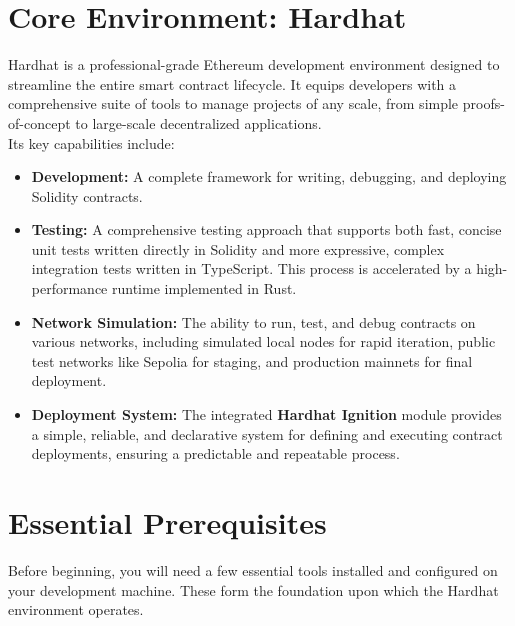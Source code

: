 \documentclass{scrbook}
\begin{document}
\section{Core Environment: Hardhat}

Hardhat is a professional-grade Ethereum development environment designed to streamline the entire smart contract lifecycle. It equips developers with a comprehensive suite of tools to manage projects of any scale, from simple proofs-of-concept to large-scale decentralized applications. \\

Its key capabilities include:

\begin{itemize}
    \item
    \textbf{Development:} A complete framework for writing, debugging, and deploying Solidity contracts.
    
    \item
    \textbf{Testing:} A comprehensive testing approach that supports both fast, concise unit tests written directly in Solidity and more expressive, complex integration tests written in TypeScript. This process is accelerated by a high-performance runtime implemented in Rust.
    
    \item
    \textbf{Network Simulation:} The ability to run, test, and debug contracts on various networks, including simulated local nodes for rapid iteration, public test networks like Sepolia for staging, and production mainnets for final deployment.
    
    \item
    \textbf{Deployment System:} The integrated \textbf{Hardhat Ignition} module provides a simple, reliable, and declarative system for defining and executing contract deployments, ensuring a predictable and repeatable process.
\end{itemize}

\newpage

\section{Essential Prerequisites}

Before beginning, you will need a few essential tools installed and configured on your development machine. These form the foundation upon which the Hardhat environment operates.
\end{document}
